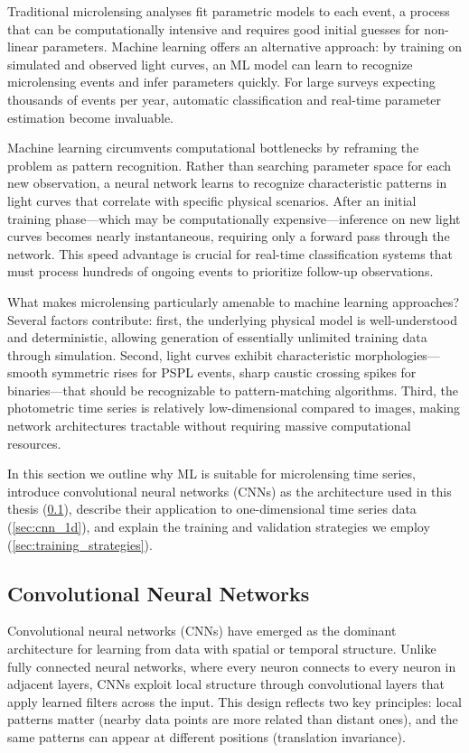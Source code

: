 Traditional microlensing analyses fit parametric models to each event, a process that can be computationally intensive and requires good initial guesses for non-linear parameters. Machine learning offers an alternative approach: by training on simulated and observed light curves, an ML model can learn to recognize microlensing events and infer parameters quickly. For large surveys expecting thousands of events per year, automatic classification and real-time parameter estimation become invaluable.

Machine learning circumvents computational bottlenecks by reframing the problem as pattern recognition. Rather than searching parameter space for each new observation, a neural network learns to recognize characteristic patterns in light curves that correlate with specific physical scenarios. After an initial training phase—which may be computationally expensive—inference on new light curves becomes nearly instantaneous, requiring only a forward pass through the network. This speed advantage is crucial for real-time classification systems that must process hundreds of ongoing events to prioritize follow-up observations.

What makes microlensing particularly amenable to machine learning approaches? Several factors contribute: first, the underlying physical model is well-understood and deterministic, allowing generation of essentially unlimited training data through simulation. Second, light curves exhibit characteristic morphologies—smooth symmetric rises for PSPL events, sharp caustic crossing spikes for binaries—that should be recognizable to pattern-matching algorithms. Third, the photometric time series is relatively low-dimensional compared to images, making network architectures tractable without requiring massive computational resources.

In this section we outline why ML is suitable for microlensing time series, introduce convolutional neural networks (CNNs) as the architecture used in this thesis (\cref{sec:cnn_fundamentals}), describe their application to one-dimensional time series data (\cref{sec:cnn_1d}), and explain the training and validation strategies we employ (\cref{sec:training_strategies}).

\subsection{Convolutional Neural Networks}
\label{sec:cnn_fundamentals}

Convolutional neural networks (CNNs) have emerged as the dominant architecture for learning from data with spatial or temporal structure. Unlike fully connected neural networks, where every neuron connects to every neuron in adjacent layers, CNNs exploit local structure through convolutional layers that apply learned filters across the input. This design reflects two key principles: local patterns matter (nearby data points are more related than distant ones), and the same patterns can appear at different positions (translation invariance).

